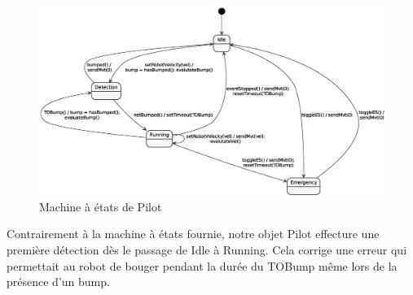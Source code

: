 \begin{figure}[H] 
    \centering
    \includegraphics[width=\linewidth]{img/maePilot.eps}
    \caption{Machine à états de Pilot}
\end{figure}

Contrairement à la machine à états fournie, notre objet Pilot effecture une première détection dès le passage de Idle à Running.
Cela corrige une erreur qui permettait au robot de bouger pendant la durée du TOBump même lors de la présence d'un bump.

